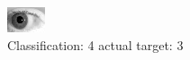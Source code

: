 \begin{figure}[h!]
\begin{center}
\includegraphics[width=0.60\columnwidth]{figures/ID279_class_4_target_3.png}
\end{center}
\caption{ Classification: 4 actual target: 3}
\label{fig:ID279_class_4_target_3}
\end{figure}
